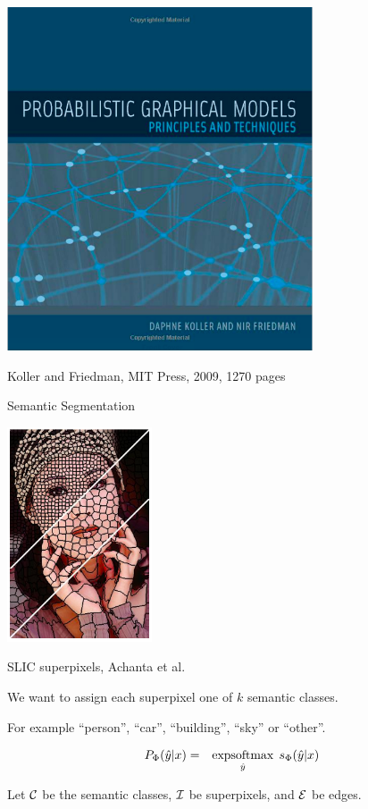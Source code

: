 {

\centerline{\includegraphics[height = 4in]{../images/Koller}}
\centerline{Koller and Friedman, MIT Press, 2009, 1270 pages}

{Semantic Segmentation}
\centerline{\includegraphics[height = 2.5in]{../images/SLICcolor}}
\centerline{\huge SLIC superpixels, Achanta et al.}

\vfill
We want to assign each superpixel one of $k$ semantic classes.

\vfill
For example ``person'', ``car'', ``building'', ``sky'' or ``other''.


\bigskip
{\color{red}
\begin{eqnarray*}
P_\Phi(\hat{y}|x) & = & \operatorname*{expsoftmax}_{\hat{y}}\;s_\Phi(\hat{y}|x)
\end{eqnarray*}
}

\vfill
Let ${\cal C}$ be the semantic classes, ${\cal I}$ be superpixels, and ${\cal E}$ be edges.

}
